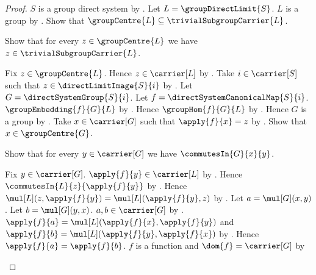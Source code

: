 \begin{proof}
    $S$ is a group direct system by
        .
    Let $L=\groupDirectLimit{S}$.
    $L$ is a group by .
    Show that $\groupCentre{L}\subseteq\trivialSubgroupCarrier{L}$.
    \begin{subproof}
        Show that for every $z\in\groupCentre{L}$ we have
            $z\in\trivialSubgroupCarrier{L}$.
        \begin{subproof}
            Fix $z\in\groupCentre{L}$.
            Hence $z\in\carrier[L]$ by
                .
            Take $i\in\carrier[S]$ such that
                $z\in\directLimitImage{S}{i}$ by
                .
            Let $G=\directSystemGroup{S}{i}$.
            Let $f=\directSystemCanonicalMap{S}{i}$.
            $\groupEmbedding{f}{G}{L}$ by
                .
            Hence $\groupHom{f}{G}{L}$ by
                .
            Hence $G$ is a group by
                .
            Take $x\in\carrier[G]$ such that $\apply{f}{x}=z$ by
                .
            Show that $x\in\groupCentre{G}$.
            \begin{subproof}
                Show that for every $y\in\carrier[G]$ we have
                    $\commutesIn{G}{x}{y}$.
                \begin{subproof}
                    Fix $y\in\carrier[G]$.
                    $\apply{f}{y}\in\carrier[L]$ by
                        .
                    Hence $\commutesIn{L}{z}{\apply{f}{y}}$ by
                        .
                    Hence $\mul[L](z,\apply{f}{y})
                        =\mul[L](\apply{f}{y},z)$ by
                        .
                    Let $a=\mul[G](x,y)$.
                    Let $b=\mul[G](y,x)$.
                    $a,b\in\carrier[G]$ by
                        .
                    $\apply{f}{a}=\mul[L]
                        (\apply{f}{x},\apply{f}{y})$ and
                        $\apply{f}{b}=\mul[L]
                        (\apply{f}{y},\apply{f}{x})$ by
                        .
                    Hence $\apply{f}{a}=\apply{f}{b}$.
                    $f$ is a function and
                        $\dom{f}=\carrier[G]$ by

\end{subproof}
\end{subproof}
\end{subproof}
\end{subproof}
\end{proof}
